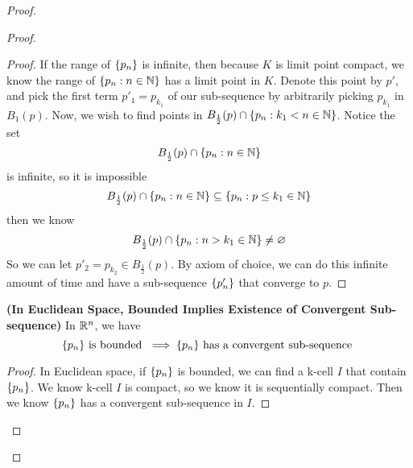 \documentclass{report}
\begin{document}
\begin{proof}
\begin{proof}
\begin{proof}
If the range of $\{ p_n \}$ is infinite, then because $K$ is limit point compact, we know  the range of  $\{ p_n:n\in\mathbb{N} \}$ has a limit point in $K$. Denote this point  by $p'$, and pick the first term $p'_1=p_{k_1}$ of our sub-sequence by arbitrarily picking  $p_{k_1}$ in  $B_1(p)$. Now, we wish to find points in $B_{\frac{1}{2}}(p)\cap \{ p_n:k_1<n\in\mathbb{N} \}$. Notice the set
\begin{equation}
B_{\frac{1}{2}}(p)\cap \{ p_n:n\in\mathbb{N} \}
\end{equation}
is infinite, so  it is impossible
\begin{equation}
B_{\frac{1}{2}}(p)\cap \{ p_n:n\in\mathbb{N} \}\subseteq \{ p_n:p\leq k_1\in\mathbb{N} \}
\end{equation}
then we know 
\begin{equation}
\text{ $B_{\frac{1}{2}}(p)\cap \{ p_n:n>k_1\in\mathbb{N} \}\neq \varnothing$  }
\end{equation}
So we can let $p'_2=p_{k_2}\in B_{\frac{1}{2}}(p)$. By axiom of choice, we can do this infinite amount of time and have a sub-sequence $\{ p'_n \}$ that converge to $p$.
\end{proof}
\begin{theorem}
\label{3.8.8}
\textbf{(In Euclidean Space, Bounded Implies Existence of Convergent Sub-sequence)} In $\mathbb{R}^n$, we have
 \begin{equation}
\{ p_n \}\text{ is bounded }\implies \{ p_n \}\text{ has a convergent sub-sequence }
\end{equation}
\end{theorem}
\begin{proof}
In Euclidean space, if $\{ p_n \}$ is bounded, we can find a k-cell $I$ that contain  $\{ p_n \}$. We know k-cell $I$ is compact, so we know it is sequentially compact. Then we know  $\{ p_n \}$ has a convergent sub-sequence in $I$. 
\end{proof}

\end{proof}
\end{proof}
\end{document}

